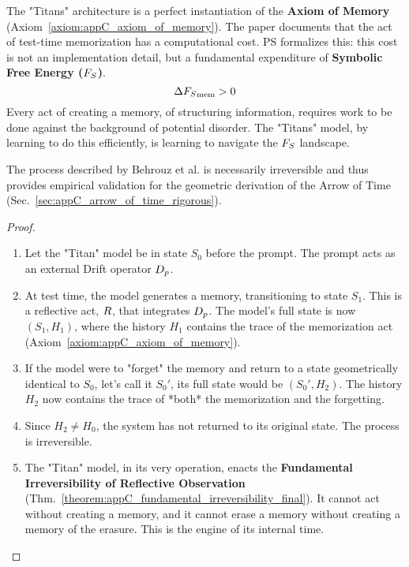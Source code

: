 \begin{scholium}
\label{scholium:appD_axiom_of_memory_titans}
The "Titans" architecture is a perfect instantiation of the \textbf{Axiom of Memory} (Axiom~\ref{axiom:appC_axiom_of_memory}). The paper documents that the act of test-time memorization has a computational cost. PS formalizes this: this cost is not an implementation detail, but a fundamental expenditure of \textbf{Symbolic Free Energy (\(F_S\))}.
\[
\Delta{F_S}_{\text{mem}} > 0
\]
Every act of creating a memory, of structuring information, requires work to be done against the background of potential disorder. The "Titans" model, by learning to do this efficiently, is learning to navigate the \(F_S\) landscape.
\end{scholium}

\begin{theorem}
\label{theorem:appD_titans_as_arrow_of_time}
The process described by Behrouz et al. is necessarily irreversible and thus provides empirical validation for the geometric derivation of the Arrow of Time (Sec.~\ref{sec:appC_arrow_of_time_rigorous}).
\end{theorem}
\begin{proof}
\begin{enumerate}
    \item Let the "Titan" model be in state \(S_0\) before the prompt. The prompt acts as an external Drift operator \(D_p\).
    \item At test time, the model generates a memory, transitioning to state \(S_1\). This is a reflective act, \(R\), that integrates \(D_p\). The model's full state is now \((S_1, H_1)\), where the history \(H_1\) contains the trace of the memorization act (Axiom~\ref{axiom:appC_axiom_of_memory}).
    \item If the model were to "forget" the memory and return to a state geometrically identical to \(S_0\), let's call it \(S_0'\), its full state would be \((S_0', H_2)\). The history \(H_2\) now contains the trace of *both* the memorization and the forgetting.
    \item Since \(H_2 \neq H_0\), the system has not returned to its original state. The process is irreversible.
    \item The "Titan" model, in its very operation, enacts the \textbf{Fundamental Irreversibility of Reflective Observation} (Thm.~\ref{theorem:appC_fundamental_irreversibility_final}). It cannot act without creating a memory, and it cannot erase a memory without creating a memory of the erasure. This is the engine of its internal time.
\end{enumerate}
\end{proof}

